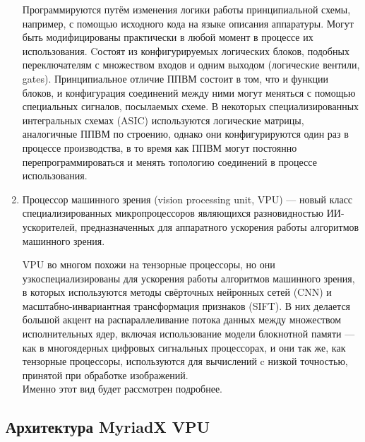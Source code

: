 \documentclass{article}
\begin{document}
\begin{enumerate}
    Программируются путём изменения логики работы принципиальной схемы, например, с помощью исходного кода на языке описания аппаратуры. Могут быть модифицированы практически в любой момент в процессе их использования. Cостоят из конфигурируемых логических блоков, подобных переключателям с множеством входов и одним выходом (логические вентили, gates). Принципиальное отличие ППВМ состоит в том, что и функции блоков, и конфигурация соединений между ними могут меняться с помощью специальных сигналов, посылаемых схеме. В некоторых специализированных интегральных схемах (ASIC) используются логические матрицы, аналогичные ППВМ по строению, однако они конфигурируются один раз в процессе производства, в то время как ППВМ могут постоянно перепрограммироваться и менять топологию соединений в процессе использования.
    \item
    Процессор машинного зрения (vision processing unit, VPU) — новый класс специализированных микропроцессоров являющихся разновидностью ИИ-ускорителей, предназначенных для аппаратного ускорения работы алгоритмов машинного зрения.
    
    VPU во многом похожи на тензорные процессоры, но они узкоспециализированы для ускорения работы алгоритмов машинного зрения, в которых используются методы свёрточных нейронных сетей (CNN) и масштабно-инвариантная трансформация признаков (SIFT). В них делается большой акцент на распараллеливание потока данных между множеством исполнительных ядер, включая использование модели блокнотной памяти — как в многоядерных цифровых сигнальных процессорах, и они так же, как тензорные процессоры, используются для вычислений c низкой точностью, принятой при обработке изображений.\\
    Именно этот вид будет рассмотрен подробнее.
    \end{enumerate} 
    
    \newpage
    \begin{center}
    \section{Архитектура MyriadX VPU}
    \end{center}
    
\end{document}
